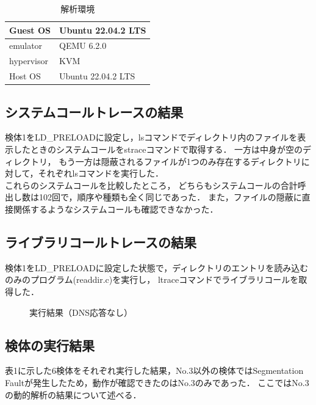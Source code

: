 \documentclass[submit,techreq,noauthor]{eco}	%
\begin{document}
\begin{table}[H]
  \caption{解析環境}
  \label{table: 解析環境}
  \centering
  \begin{tabular}{|l|l|}
  \hline
  Guest OS   & Ubuntu 22.04.2 LTS \\ \hline
  emulator   & QEMU 6.2.0         \\ \hline
  hypervisor & KVM                \\ \hline
  Host OS    & Ubuntu 22.04.2 LTS \\ \hline
  \end{tabular}
\end{table}


\subsection{システムコールトレースの結果}
検体1をLD\_PRELOADに設定し，lsコマンドでディレクトリ内のファイルを表示したときのシステムコールをstraceコマンドで取得する．
一方は中身が空のディレクトリ，
もう一方は隠蔽されるファイルが1つのみ存在するディレクトリに対して，それぞれlsコマンドを実行した．\\
\indent
これらのシステムコールを比較したところ，
どちらもシステムコールの合計呼出し数は102回で，順序や種類も全く同じであった．
また，ファイルの隠蔽に直接関係するようなシステムコールも確認できなかった．

\subsection{ライブラリコールトレースの結果}
検体1をLD\_PRELOADに設定した状態で，ディレクトリのエントリを読み込むのみのプログラム(readdir.c)を実行し，
ltraceコマンドでライブラリコールを取得した．

\begin{figure}[H]
	\centering
	\caption{実行結果（DNS応答なし）}
	\label{fig:ltrace}
\end{figure}

\subsection{検体の実行結果}
表1に示した6検体をそれぞれ実行した結果，No.3以外の検体ではSegmentation Faultが発生したため，動作が確認できたのはNo.3のみであった．
ここではNo.3の動的解析の結果について述べる．
\end{document}
